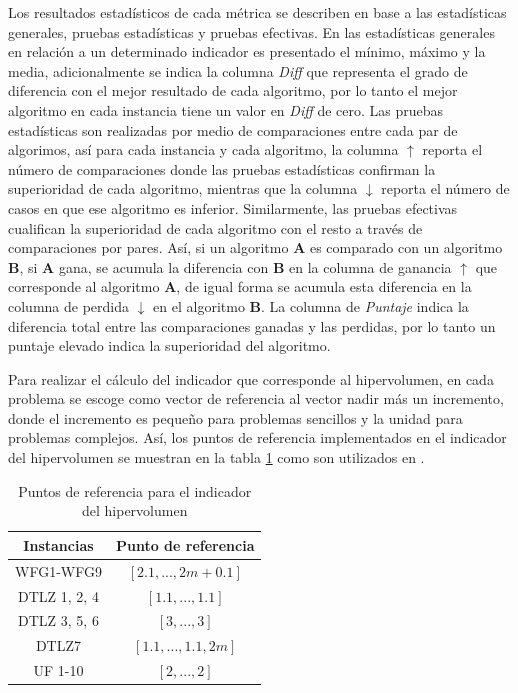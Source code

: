 Los resultados estadísticos de cada métrica se describen en base a las estadísticas generales, pruebas estadísticas y pruebas efectivas.
%
En las estadísticas generales en relación a un determinado indicador es presentado el mínimo, máximo y la media, adicionalmente se indica la columna \textit{Diff} que representa el grado de diferencia con el mejor resultado de cada algoritmo, por lo tanto el mejor algoritmo en cada instancia tiene un valor en \textit{Diff} de cero.
%
Las pruebas estadísticas son realizadas por medio de comparaciones entre cada par de algorimos, así para cada instancia y cada algoritmo, la columna $\uparrow$ reporta el número de comparaciones donde las pruebas estadísticas confirman la superioridad de cada algoritmo, mientras que la columna $\downarrow$ reporta el número de casos en que ese algoritmo es inferior.
%
Similarmente, las pruebas efectivas cualifican la superioridad de cada algoritmo con el resto a través de comparaciones por pares.
%
Así, si un algoritmo \textbf{A} es comparado con un algoritmo \textbf{B}, si \textbf{A} gana, se acumula la diferencia con \textbf{B} en la columna de ganancia $\uparrow$ que corresponde al algoritmo \textbf{A}, de igual forma se acumula esta diferencia en la columna de perdida $\downarrow$ en el algoritmo \textbf{B}.
%
La columna de \textit{Puntaje} indica la diferencia total entre las comparaciones ganadas y las perdidas, por lo tanto un puntaje elevado indica la superioridad del algoritmo.
%

Para realizar el cálculo del indicador que corresponde al hipervolumen, en cada problema se escoge como vector de referencia al vector nadir más un incremento, donde el incremento es pequeño para problemas sencillos y la unidad para problemas complejos.
%
Así, los puntos de referencia implementados en el indicador del hipervolumen se muestran en la tabla \ref{tab:ReferencePoints} como son utilizados en \cite{berengueroptimizacion}.

\begin{table}[H]
\centering
\caption{Puntos de referencia para el indicador del hipervolumen}
\label{tab:ReferencePoints}
\begin{tabular}{cc}
\hline
\textbf{Instancias} & \textbf{Punto de referencia} \\ \hline
WFG1-WFG9 & $[2.1, ...,2m+0.1]$ \\
DTLZ 1, 2, 4 & $[1.1, ..., 1.1]$ \\
DTLZ 3, 5, 6 & $[3, ..., 3]$ \\
DTLZ7 & $[1.1, ..., 1.1, 2m]$ \\
UF 1-10 & $[2, ..., 2]$ \\ \hline
\end{tabular}
\end{table}



